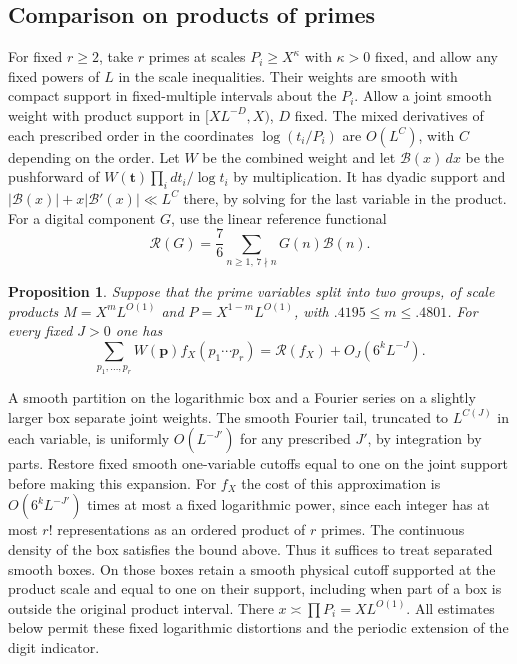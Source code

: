 \documentclass[11pt,a4paper]{article}
\theoremstyle{paperplain}
\newtheorem{proposition}[theorem]{Proposition}
\numberwithin{equation}{section}
\begin{document}
\subsection{Comparison on products of primes}\label{seven:setup}
For fixed $r\ge2$, take $r$ primes at scales $P_i\ge X^\kappa$
with $\kappa>0$ fixed, and allow any fixed powers of $L$ in the
scale inequalities. Their weights are smooth with compact support in
fixed-multiple intervals about the $P_i$. Allow a joint smooth weight
with product support in $[X L^{-D},X)$, $D$ fixed. The mixed
derivatives of each prescribed order in the coordinates
$\log(t_i/P_i)$ are $O(L^{C})$, with $C$ depending on the order.
Let $W$ be the combined weight and let $\mathcal B(x)\,dx$ be the
pushforward of $W(\boldsymbol t)\prod_i dt_i/\log t_i$ by multiplication.
It has dyadic support and
$|\mathcal B(x)|+x|\mathcal B'(x)|\ll L^C$ there, by solving for the
last variable in the product. For a digital component $G$, use
the linear reference functional
\[
  \mathcal R(G)=\frac76\sum_{n\ge1,\,7\nmid n} G(n)\mathcal B(n).
\]

\begin{proposition}\label{seven:grouped}
Suppose that the prime variables split into two groups, of scale
products $M=X^m L^{O(1)}$ and $P=X^{1-m} L^{O(1)}$, with
$.4195\le m\le .4801$. For every fixed $J>0$ one has
\[
 \sum_{p_1,\ldots,p_r}W(\boldsymbol p) f_X(p_1\cdots p_r)
   =\mathcal R(f_X)+O_J(6^k L^{-J}).
\]
\end{proposition}

A smooth partition on the logarithmic box and a Fourier series on a
slightly larger box separate joint weights. The smooth Fourier tail,
truncated to $L^{C(J)}$ in each variable, is uniformly $O(L^{-J'})$
for any prescribed $J'$, by integration by parts. Restore fixed smooth
one-variable cutoffs equal to one on the joint support before making
this expansion. For $f_X$ the cost of this approximation is
$O(6^k L^{-J'})$ times at most a fixed logarithmic power, since
each integer has at most $r!$ representations as an ordered product
of $r$ primes. The continuous density of the box satisfies the
bound above. Thus it suffices to treat separated smooth boxes. On
those boxes retain a smooth physical cutoff supported at the product
scale and equal to one on their support, including when part of a box
is outside the original product interval. There $x\asymp\prod P_i
=X L^{O(1)}$. All estimates below permit these fixed logarithmic
distortions and the periodic extension of the digit indicator.
\end{document}
